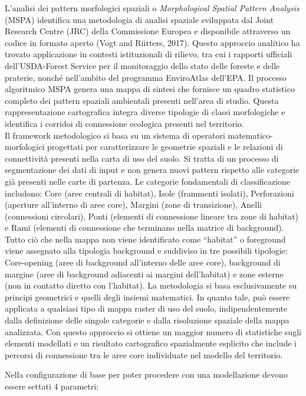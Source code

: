 \documentclass[
]{book}
\begin{document}
L'analisi dei pattern morfologici spaziali o \emph{Morphological Spatial Pattern Analysis} (MSPA) identifica una metodologia di analisi spaziale sviluppata dal Joint Research Centre (JRC) della Commissione Europea e disponibile attraverso un codice in formato aperto (Vogt and Riitters, 2017).
Questo approccio analitico ha trovato applicazione in contesti istituzionali di rilievo, tra cui i rapporti ufficiali dell'USDA-Forest Service per il monitoraggio dello stato delle foreste e delle praterie, nonché nell'ambito del programma EnviroAtlas dell'EPA. Il processo algoritmico MSPA genera una mappa di sintesi che fornisce un quadro statistico completo dei pattern spaziali ambientali presenti nell'area di studio.
Questa rappresentazione cartografica integra diverse tipologie di classi morfologiche e identifica i corridoi di connessione ecologica presenti nel territorio.\\
Il framework metodologico si basa su un sistema di operatori matematico-morfologici progettati per caratterizzare le geometrie spaziali e le relazioni di connettività presenti nella carta di uso del suolo.
Si tratta di un processo di segmentazione dei dati di input e non genera nuovi pattern rispetto alle categorie già presenti nelle carte di partenza.
Le categorie fondamentali di classificazione includono: Core (aree centrali di habitat), Isole (frammenti isolati), Perforazioni (aperture all'interno di aree core), Margini (zone di transizione), Anelli (connessioni circolari), Ponti (elementi di connessione lineare tra zone di habitat) e Rami (elementi di connessione che terminano nella matrice di background).
Tutto ciò che nella mappa non viene identificato come ``habitat'' o foreground viene assegnato alla tipologia background e suddiviso in tre possibili tipologie: Core-opening (aree di background all'interno delle aree core), background di margine (aree di background adiacenti ai margini dell'habitat) e zone esterne (non in contatto diretto con l'habitat).
La metodologia si basa esclusivamente su principi geometrici e quelli degli insiemi matematici.
In quanto tale, può essere applicata a qualsiasi tipo di mappa raster di uso del suolo, indipendentemente dalla definizione delle singole categorie e dalla risoluzione spaziale della mappa analizzata.
Con questo approccio si ottiene un maggior numero di statistiche sugli elementi modellati e un risultato cartografico spazialmente esplicito che include i percorsi di connessione tra le aree core individuate nel modello del territorio.

Nella configurazione di base per poter procedere con una modellazione devono essere settati 4 parametri:
\end{document}
